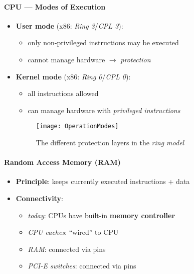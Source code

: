 \paragraph{CPU --- Modes of Execution}
\begin{itemize}
	\item \textbf{User mode} (x86: \emph{Ring 3}/\emph{CPL 3}):
		\begin{itemize}
			\item only non-privileged instructions may be executed
			\item cannot manage hardware $ \to $ \emph{protection}
		\end{itemize}
	\item \textbf{Kernel mode} (x86: \emph{Ring 0}/\emph{CPL 0}):
		\begin{itemize}
			\item all instructions allowed
			\item can manage hardware with \emph{privileged instructions}
		\end{itemize}
		\begin{figure}[h]\centering\label{OperationModes}\texttt{[image: OperationModes]}\caption{The different protection layers in the \emph{ring model}}\end{figure}
\end{itemize}

\paragraph{Random Access Memory (RAM)}
\begin{itemize}
	\item \textbf{Principle}: keeps currently executed instructions + data
	\item \textbf{Connectivity}:
	\begin{itemize}
		\item \emph{today}: CPUs have built-in \textbf{memory controller} 
		\item \emph{CPU caches}: ``wired'' to CPU
		\item \emph{RAM}: connected via pins
		\item \emph{PCI-E switches}: connected via pins
	\end{itemize}
\end{itemize}

